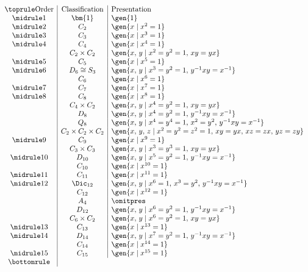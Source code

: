
\begin{displaymath}
\begin{array}{c|c|l}
\toprule
\text{Order} & \text{Classification} & \text{Presentation} \\
\midrule
1 & \bm{1} & \gen{1} \\
\midrule
2 & C_2 & \gen{x \mid x^2 = 1} \\
\midrule
3 & C_3 & \gen{x \mid x^3 = 1} \\
\midrule
4 & C_4 & \gen{x \mid x^4 = 1} \\
  & C_2 \times C_2 & \gen{x,\,y \mid x^2 = y^2 = 1,\, xy = yx} \\
\midrule
5 & C_5 & \gen{x \mid x^5 = 1} \\
\midrule
6 & D_6 \cong S_3 & \gen{x,\,y \mid x^3 = y^2 = 1,\, y^{-1}xy = x^{-1}} \\
  & C_6 & \gen{x \mid x^6 = 1} \\
\midrule
7 & C_7 & \gen{x \mid x^7 = 1} \\
\midrule
8 & C_8 & \gen{x \mid x^8 = 1} \\
  & C_4 \times C_2 & \gen{x,\,y \mid x^4 = y^2 = 1,\, xy = yx} \\
  & D_8 & \gen{x,\,y \mid x^4 = y^2 = 1,\, y^{-1}xy = x^{-1}} \\
  & Q_8 & \gen{x,\,y \mid x^4 = y^4 = 1,\, x^2 = y^2,\, y^{-1}xy = x^{-1}} \\
  & C_2 \times C_2 \times C_2 & \gen{x,\,y,\,z \mid x^2 = y^2 = z^2 = 1,\, xy = yx,\, xz = zx,\, yz = zy} \\
\midrule
9 & C_9 & \gen{x \mid x^9 = 1} \\
  & C_3 \times C_3 & \gen{x,\,y \mid x^3 = y^3 = 1,\, xy = yx} \\
\midrule
10 & D_{10} & \gen{x,\,y \mid x^5 = y^2 = 1,\, y^{-1}xy = x^{-1}} \\
   & C_{10} & \gen{x \mid x^{10} = 1} \\
\midrule
11 & C_{11} & \gen{x \mid x^{11} = 1} \\
\midrule
12 & \Dic_{12} & \gen{x,\,y \mid x^6 = 1,\, x^3 = y^2,\, y^{-1}xy = x^{-1}} \\
   & C_{12} & \gen{x \mid x^{12} = 1} \\
   & A_4 & {\omitpres} \\ %
   & D_{12} & \gen{x,\,y \mid x^6 = y^2 = 1,\, y^{-1}xy = x^{-1}} \\
   & C_6 \times C_2 & \gen{x,\,y \mid x^6 = y^2 = 1,\, xy = yx} \\
\midrule
13 & C_{13} & \gen{x \mid x^{13} = 1} \\
\midrule
14 & D_{14} & \gen{x,\,y \mid x^7 = y^2 = 1,\, y^{-1}xy = x^{-1}} \\
   & C_{14} & \gen{x \mid x^{14} = 1} \\
\midrule
15 & C_{15} & \gen{x \mid x^{15} = 1} \\
\bottomrule
\end{array}
\end{displaymath}


